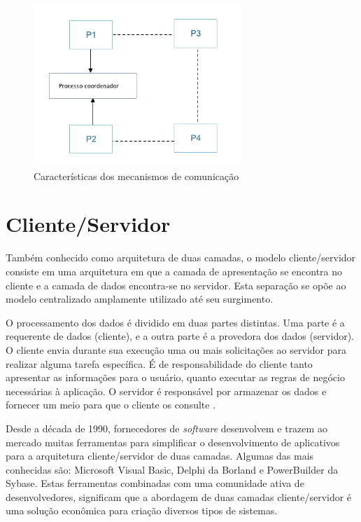 \begin{figure}
    \centering
    \includegraphics[width=0.7\textwidth]{figuras/ipc.png}
    \caption{Características dos mecanismos de comunicação }
    \label{fig:how-communication-works}
\end{figure}

\section{Cliente/Servidor}\label{sec:clientserver}

Também conhecido como arquitetura de duas camadas, o modelo cliente/servidor consiste em uma arquitetura em que a camada de apresentação se encontra no cliente e a camada de dados encontra-se no servidor. Esta separação se opõe ao modelo centralizado amplamente utilizado até seu surgimento.

O processamento dos dados é dividido em duas partes distintas. Uma parte é a requerente de dados (cliente), e a outra parte é a provedora dos dados (servidor). O cliente envia durante sua execução uma ou mais solicitações ao servidor para realizar alguma tarefa específica. É de responsabilidade do cliente tanto apresentar as informações para o usuário, quanto executar as regras de negócio necessárias à aplicação. O servidor é responsável por armazenar os dados e fornecer um meio para que o cliente os consulte \cite{two-tier}.

Desde a década de 1990, fornecedores de \textit{software} desenvolvem e trazem ao mercado muitas ferramentas para simplificar o desenvolvimento de aplicativos para a arquitetura cliente/servidor de duas camadas. Algumas das mais conhecidas são: Microsoft Visual Basic, Delphi da Borland e PowerBuilder da Sybase. Estas ferramentas combinadas com uma comunidade ativa de desenvolvedores, significam que a abordagem de duas camadas cliente/servidor é uma solução econômica para criação diversos tipos de sistemas.

